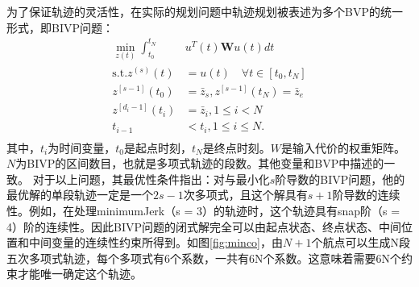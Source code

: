 \documentclass[master,academic]{ysuthesis} %
\begin{document}
		为了保证轨迹的灵活性，在实际的规划问题中轨迹规划被表述为多个BVP的统一形式，即BIVP问题：
		\begin{equation}
			\begin{aligned}
				\min_{z(t)}\int_{t_0}^{t_N}&u^T(t)\mathbf{W}u(t)dt\\
				\text{s.t}.z^{( s )}(t) &=u(t) \quad \forall t\in \left[ t_0,t_N \right]\\
				z^{\left[ s-1 \right]}( t_0 ) &=\bar{z}_s,z^{\left[ s-1 \right]}( t_N ) =\bar{z}_e\\
				z^{\left[ d_i-1 \right]}( t_i ) &=\bar{z}_i,1\leq i<N\\
				t_{i-1}&<t_i,1\leq i\leq N.\\
			\end{aligned}
		\end{equation}
		其中，$t_i$为时间变量，$t_0$是起点时刻，$t_N$是终点时刻。$W$是输入代价的权重矩阵。$N$为BIVP的区间数目，也就是多项式轨迹的段数。其他变量和BVP中描述的一致。
		对于以上问题，其最优性条件指出：对与最小化$s$阶导数的BIVP问题，他的最优解的单段轨迹一定是一个$2s-1$次多项式，且这个解具有$s+1$阶导数的连续性。例如，在处理minimumJerk（s = 3）的轨迹时，这个轨迹具有snap阶（s = 4）阶的连续性。因此BIVP问题的闭式解完全可以由起点状态、终点状态、中间位置和中间变量的连续性约束所得到。如图\ref{fig:minco}，由$N+1$个航点可以生成N段五次多项式轨迹，每个多项式有6个系数，一共有6N个系数。这意味着需要6N个约束才能唯一确定这个轨迹。
	
\end{document}
